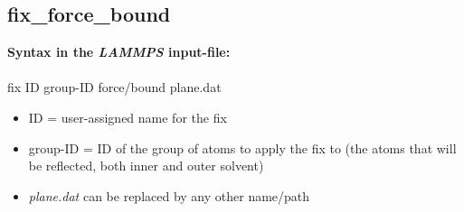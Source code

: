 \documentclass[a4paper,10pt]{scrreprt}
\begin{document}
\subsection{fix\_force\_bound}
\label{sub:fix_force_bound}

\textbf{Syntax in the \textit{LAMMPS} input-file:}\\ \\
{ fix ID group-ID force/bound plane.dat}
\begin{itemize}
\item ID = user-assigned name for the fix
\item group-ID = ID of the group of atoms to apply the fix to (the atoms that will be reflected, both inner and outer solvent)
\item \textit{plane.dat} can be replaced by any other name/path
\end{itemize}
\end{document}
